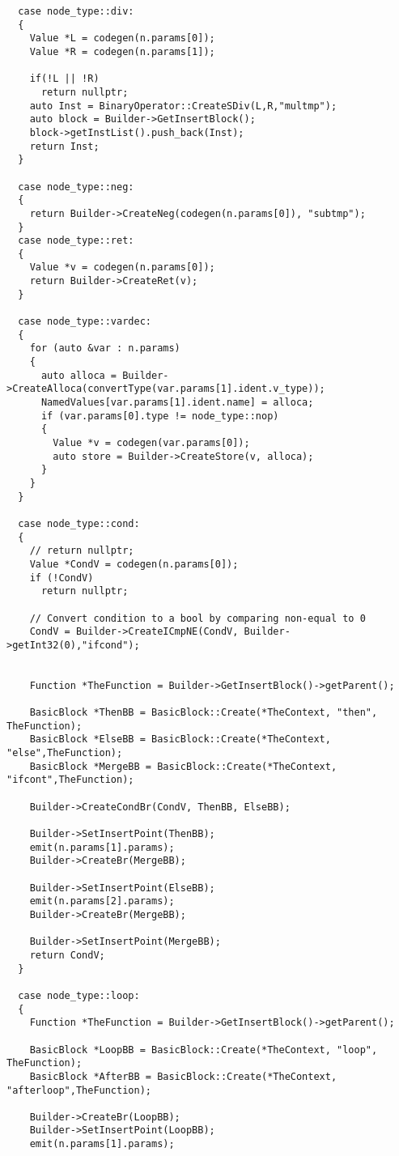 \documentclass[english,a4paper,12pt]{report}
\begin{document}
\begin{lstlisting}
  case node_type::div:
  {
    Value *L = codegen(n.params[0]);
    Value *R = codegen(n.params[1]);

    if(!L || !R)
      return nullptr;
    auto Inst = BinaryOperator::CreateSDiv(L,R,"multmp");
    auto block = Builder->GetInsertBlock();
    block->getInstList().push_back(Inst);
    return Inst;
  }

  case node_type::neg:
  {
    return Builder->CreateNeg(codegen(n.params[0]), "subtmp");
  }
  case node_type::ret:
  {
    Value *v = codegen(n.params[0]);
    return Builder->CreateRet(v);
  }

  case node_type::vardec:
  {
    for (auto &var : n.params)
    {
      auto alloca = Builder->CreateAlloca(convertType(var.params[1].ident.v_type));
      NamedValues[var.params[1].ident.name] = alloca;
      if (var.params[0].type != node_type::nop)
      {
        Value *v = codegen(var.params[0]);
        auto store = Builder->CreateStore(v, alloca);
      }
    }
  }

  case node_type::cond:
  {
    // return nullptr;
    Value *CondV = codegen(n.params[0]);
    if (!CondV)
      return nullptr;

    // Convert condition to a bool by comparing non-equal to 0
    CondV = Builder->CreateICmpNE(CondV, Builder->getInt32(0),"ifcond");


    Function *TheFunction = Builder->GetInsertBlock()->getParent();

    BasicBlock *ThenBB = BasicBlock::Create(*TheContext, "then", TheFunction);
    BasicBlock *ElseBB = BasicBlock::Create(*TheContext, "else",TheFunction);
    BasicBlock *MergeBB = BasicBlock::Create(*TheContext, "ifcont",TheFunction);

    Builder->CreateCondBr(CondV, ThenBB, ElseBB);

    Builder->SetInsertPoint(ThenBB);
    emit(n.params[1].params);
    Builder->CreateBr(MergeBB);

    Builder->SetInsertPoint(ElseBB);
    emit(n.params[2].params);
    Builder->CreateBr(MergeBB);

    Builder->SetInsertPoint(MergeBB);
    return CondV;
  }

  case node_type::loop:
  {
    Function *TheFunction = Builder->GetInsertBlock()->getParent();

    BasicBlock *LoopBB = BasicBlock::Create(*TheContext, "loop", TheFunction);
    BasicBlock *AfterBB = BasicBlock::Create(*TheContext, "afterloop",TheFunction);
    
    Builder->CreateBr(LoopBB);
    Builder->SetInsertPoint(LoopBB);
    emit(n.params[1].params);


\end{lstlisting}
\end{document}
